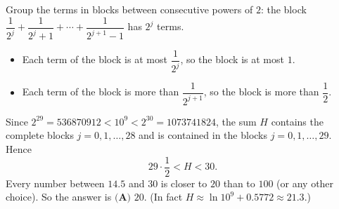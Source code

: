Group the terms in blocks between consecutive powers of $2$: the block $\dfrac1{2^j}+\dfrac1{2^j+1}+\cdots+\dfrac1{2^{j+1}-1}$ has $2^j$ terms.
\begin{itemize}
\item Each term of the block is at most $\dfrac1{2^j}$, so the block is at most $1$.
\item Each term of the block is more than $\dfrac1{2^{j+1}}$, so the block is more than $\dfrac12$.
\end{itemize}
Since $2^{29}=536870912<10^9<2^{30}=1073741824$, the sum $H$ contains the complete blocks $j=0,1,\dots,28$ and is contained in the blocks $j=0,1,\dots,29$. Hence
\[29\cdot\dfrac12<H<30.\]
Every number between $14.5$ and $30$ is closer to $20$ than to $100$ (or any other choice). So the answer is $\boxed{\textbf{(A) }20}$. (In fact $H\approx\ln10^9+0.5772\approx21.3$.)
